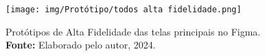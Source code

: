 \label{ap:prototipos}

\begin{figure}[H]
    \centering
    \texttt{[image: img/Protótipo/todos alta fidelidade.png]}
    \caption{ Protótipos de Alta Fidelidade das telas principais no Figma. \\
        \textbf{Fonte:} Elaborado pelo autor, 2024.}
    \label{fig:prototipo_alta_fidelidade}
\end{figure}